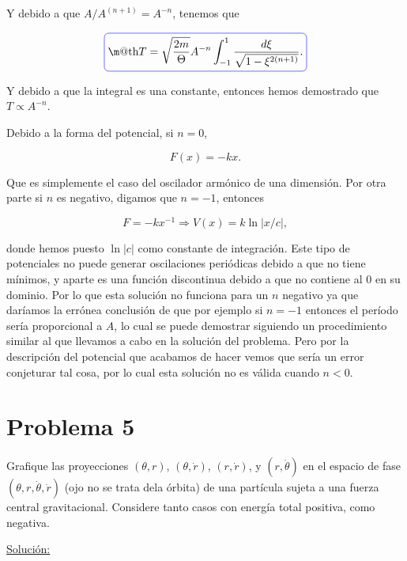 \documentclass[a4paper,10pt]{article}
\makeatletter
\numberwithin{equation}{section}
\newcommand*{\boxcolor}{blue}
\renewcommand{\boxed}[1]{\textcolor{\boxcolor}{%
\tikz[baseline={([yshift=-1ex]current bounding box.center)}] \node [rectangle, minimum width=1ex,rounded corners,draw] {\normalcolor\m@th$\displaystyle#1$};}}
\makeatother
\begin{document}
Y debido a que $A/A^{(n+1)} = A^{-n}$, tenemos que 

\begin{equation}
 \boxed{T = \sqrt{\frac{2m}{\Theta}} A^{-n} \int_{-1}^1 \frac{d\xi}{\sqrt{1-\xi^{2(n+1)}}}.}
\end{equation}

Y debido a que la integral es una constante, entonces hemos demostrado que $T \propto A^{-n}$.

\vspace{.3cm}

Debido a la forma del potencial, si $n=0$,

\begin{equation}
 F(x) = -k x.
\end{equation}

Que es simplemente el caso del oscilador armónico de una dimensión. Por otra parte si 
$n$ es negativo, digamos que $n=-1$, entonces 

\begin{equation}
 F = - k x^{-1} \Rightarrow V(x) = k \ln{|x/c|},
\end{equation}

donde hemos puesto $\ln{|c|}$ como constante de integración. Este tipo de potenciales
no puede generar oscilaciones periódicas debido a que no tiene mínimos, y aparte 
es una función discontinua debido a que no contiene al 0 en su dominio. Por lo que 
esta solución no funciona para un $n$ negativo ya que daríamos la errónea conclusión de
que por ejemplo si $n=-1$ entonces el período sería proporcional a $A$, lo cual se 
puede demostrar siguiendo un procedimiento similar al que llevamos a cabo en la solución 
del problema. Pero por la descripción del potencial que acabamos de hacer vemos que 
sería un error conjeturar tal cosa, por lo cual esta solución no es válida cuando 
$n<0$.

\section{Problema 5}

Grafique las proyecciones $(\theta,r)$, $(\theta,\dot{r})$, $(r,\dot{r})$,
y $(r,\dot{\theta})$ en el espacio de fase $(\theta,r,\dot{\theta},\dot{r})$
(ojo no se trata dela órbita) de una partícula sujeta a una fuerza central 
gravitacional. Considere tanto casos con energía total positiva, como 
negativa.

\vspace{.3cm}

\underline{Solución:} \vspace{.3cm}
\end{document}
